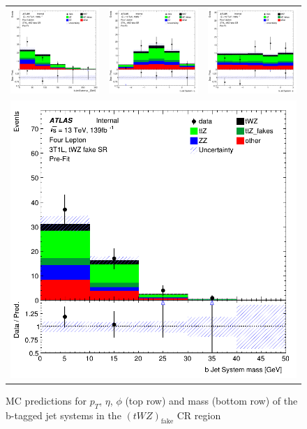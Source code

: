 \begin{figure}[htbp]
\centering
  \begin{tabular}{ccc}

    \includegraphics[width=.2\textwidth]{figures/PreFitPlots/lep4_tWZ_3T1L_bJet_sys_Pt}&
    \includegraphics[width=.2\textwidth]{figures/PreFitPlots/lep4_tWZ_3T1L_bJet_sys_Eta} &
    \includegraphics[width=.2\textwidth]{figures/PreFitPlots/lep4_tWZ_3T1L_bJet_sys_Phi} \\
    \multicolumn{3}{c}{\includegraphics[width=.2\textwidth]{figures/PreFitPlots/lep4_tWZ_3T1L_bJet_sys_mass}}

  \end{tabular}
  \caption{MC predictions for $p_{T}$, $\eta$, $\phi$ (top row) and mass (bottom row) of the b-tagged jet systems in the $(tWZ)_{\text{fake}}$ CR region }
  \label{fig:4lep-3T1L-CR-bjet-sys-Plots}
\end{figure}


